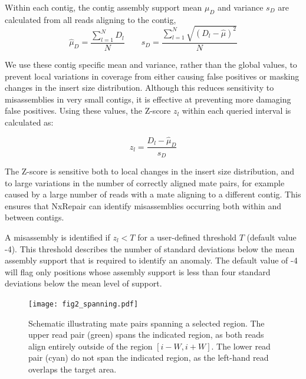 \documentclass[fleqn,10pt]{wlpeerj}
\begin{document}
Within each contig, the contig assembly support mean $\mu_D$ and variance $s_D$ are calculated from all reads aligning to the contig,
\begin{equation}
\hat{\mu}_D = \frac{\sum_{l=1}^N D_l}{N} \qquad s_D = \frac{\sum_{l=1}^N \sqrt{(D_l - \hat{\mu})^2}}{N}
\label{eq:contigD}
\end{equation}

We use these contig specific mean and variance, rather than the global values, to prevent local variations in coverage from either causing false positives or masking changes in the insert size distribution. Although this reduces sensitivity to misassemblies in very small contigs, it is effective at preventing more damaging false positives. Using these values, the Z-score $z_l$ within each queried interval is calculated as: 

\begin{equation}
z_l = \frac{D_l - \hat{\mu}_D}{s_D}
\label{eq:zscore}
\end{equation}

The Z-score is sensitive both to local changes in the insert size distribution, and to large variations in the number of correctly aligned mate pairs, for example caused by a large number of reads with a mate aligning to a different contig. This ensures that NxRepair can identify misassemblies occurring both within and between contigs.  

A misassembly is identified if $z_l < T$ for a user-defined threshold $T$ (default value -4). This threshold describes the number of standard deviations below the mean assembly support that is required to identify an anomaly. The default value of -4 will flag only positions whose assembly support is less than four standard deviations below the mean level of support.

\begin{figure}
\centerline{\texttt{[image: fig2\_spanning.pdf]}}
\caption{Schematic illustrating mate pairs spanning a selected region. The upper read pair (green) spans the indicated region, as both reads align entirely outside of the region $[i-W, i+W]$. The lower read pair (cyan) do not span the indicated region, as the left-hand read overlaps the target area. \label{fig:spanning}}
\end{figure}
\end{document}
